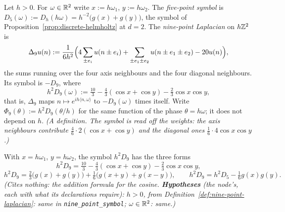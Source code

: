 \begin{definition}
\label{def:nine-point-laplacian}
\leanok
{}
Let $h > 0$. For $\omega \in \mathbb{R}^2$ write $x := h\omega_1$, $y := h\omega_2$. The \emph{five-point
symbol} is $D_5(\omega) := D_h(h\omega) = h^{-2}\bigl(g(x) + g(y)\bigr)$, the symbol of
Proposition~\ref{prop:discrete-helmholtz} at $d = 2$. The \emph{nine-point Laplacian} on $h\mathbb{Z}^2$ is
\[
  \Delta_9u(n) := \frac{1}{6h^2}\Bigl(4\sum_{\pm e_i}u(n \pm e_i)
  + \sum_{\pm e_1 \pm e_2}u(n \pm e_1 \pm e_2) - 20u(n)\Bigr),
\]
the sums running over the four axis neighbours and the four diagonal neighbours. Its symbol is
$-D_9$, where
\[
  h^2D_9(\omega) := \tfrac{10}{3} - \tfrac43(\cos x + \cos y) - \tfrac23\cos x\cos y ,
\]
that is, $\Delta_9$ maps $n \mapsto e^{ih\langle n, \omega\rangle}$ to $-D_9(\omega)$ times itself.
Write $\Phi_9(\theta) := h^2D_9(\theta/h)$ for the same function of the phase $\theta = h\omega$; it
does not depend on $h$.
\statusT\quad\emph{(A definition. The symbol is read off the weights: the axis neighbours contribute
$\tfrac{4}{6}\cdot 2(\cos x + \cos y)$ and the diagonal ones $\tfrac16\cdot 4\cos x\cos y$.)}
\end{definition}

\begin{lemma}
\label{lem:nine-point-symbol}
\leanok
{}
With $x = h\omega_1$, $y = h\omega_2$, the symbol $h^2D_9$ has the three forms
\[
  h^2D_9 = \tfrac{10}{3} - \tfrac43(\cos x + \cos y) - \tfrac23\cos x\cos y ,
\]
\[
  h^2D_9 = \tfrac23\bigl(g(x) + g(y)\bigr) + \tfrac16\bigl(g(x+y) + g(x-y)\bigr) , \qquad
  h^2D_9 = h^2D_5 - \tfrac16g(x)g(y) .
\]
\statusT\quad\emph{(Cites nothing: the addition formula for the cosine. \textbf{Hypotheses} (the
node's, each with what its declarations require): $h > 0$, from Definition~\ref{def:nine-point-laplacian}:
same in \texttt{nine\_point\_symbol}; $\omega \in \mathbb{R}^2$: same.)}
\end{lemma}

